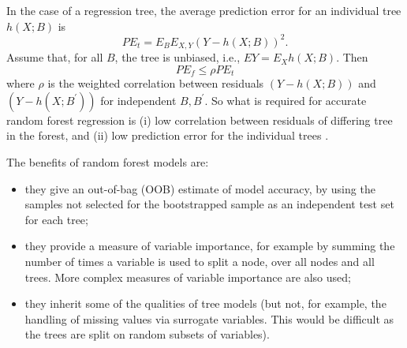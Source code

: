 \documentclass[10pt,letterpaper]{article}
\begin{document}
In the case of a regression tree, the average prediction error for an individual tree $h(X; B)$ is
\begin{equation}
PE_t = E_B E_{X,Y} (Y-h(X; B))^2.
\end{equation}
Assume that, for all $B$, the tree is unbiased, i.e., $EY= E_X h(X; B)$. Then
\begin{equation}
PE_f \leq \rho PE_t
\end{equation}
where $\rho$ is the weighted correlation between residuals $(Y-h(X;B))$ and $(Y-h(X;B^\prime))$ for independent
$B,B^\prime$.
So what is required for accurate random forest regression is (i) low correlation between residuals of differing tree in
the forest, and (ii) low prediction error for the individual trees \cite{Segal.2004}. 

The benefits of random forest models are:
\begin{itemize}
\item they give an out-of-bag (OOB) estimate of model accuracy, by using the samples not selected for the bootstrapped sample
  as an independent test set for each tree;
\item they provide a measure of variable importance, for example by summing the number of times a variable is used to
  split a node, over all nodes and all trees. More complex measures of variable importance are also used;
\item they inherit some of the qualities of tree models (but not, for example, the handling of missing values via surrogate
  variables. This would be difficult as the trees are split on random subsets of variables).
\end{itemize}
\end{document}
